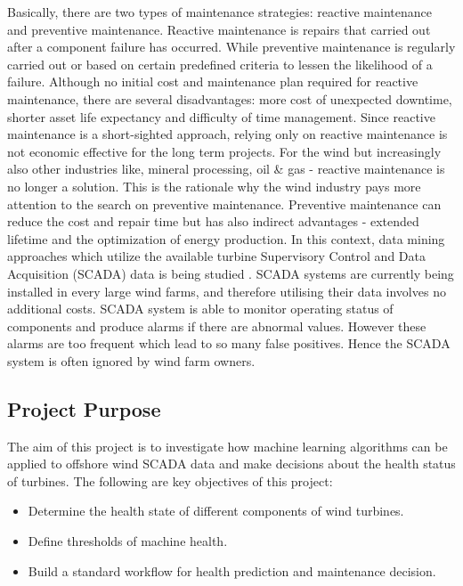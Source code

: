 Basically, there are two types of maintenance strategies: reactive maintenance and preventive maintenance. Reactive maintenance is repairs that carried out after a component failure has occurred. While preventive maintenance is regularly carried out or based on certain predefined criteria to lessen the likelihood of a failure. Although no initial cost and maintenance plan required for reactive maintenance, there are several disadvantages: more cost of unexpected downtime, shorter asset life expectancy and difficulty of time management. Since reactive maintenance is a short-sighted approach, relying only on reactive maintenance is not economic effective for the long term projects. For the wind but increasingly also other industries like, mineral processing, oil \& gas - reactive maintenance is no longer a solution. This is the rationale why the wind industry pays more attention to the search on preventive maintenance. Preventive maintenance can reduce the cost and repair time but has also indirect advantages - extended lifetime and the optimization of energy production. In this context, data mining approaches which utilize the available turbine Supervisory Control and Data Acquisition (SCADA) data is being studied \cite{godwin2013classification}. SCADA systems are currently being installed in every large wind farms, and therefore utilising their data involves no additional costs. SCADA system is able to monitor operating status of components and produce alarms if there are abnormal values. However these alarms are too frequent which lead to so many false positives. Hence the SCADA system is often ignored by wind farm owners.

\subsection{Project Purpose}
The aim of this project is to investigate how machine learning algorithms can be applied to offshore wind SCADA data and make decisions about the health status of turbines. The following are key objectives of this project:

\begin{itemize}
\item Determine the health state of different components of wind turbines.
\item Define thresholds of machine health.
\item Build a standard workflow for health prediction and maintenance decision.
\end{itemize}

